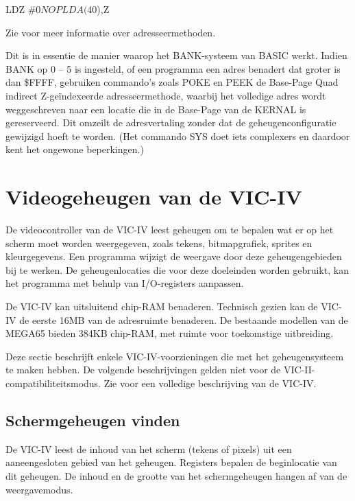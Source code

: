 \begin{asmcode}
LDZ #$0
NOP
LDA ($40),Z
\end{asmcode}

Zie  voor meer informatie over adresseermethoden.

Dit is in essentie de manier waarop het BANK-systeem van BASIC werkt. Indien BANK op 0 -- 5 is ingesteld, of een programma een adres benadert dat groter is dan \$FFFF, gebruiken commando's zoals POKE en PEEK de Base-Page Quad indirect Z-geïndexeerde adresseermethode, waarbij het volledige adres wordt weggeschreven naar een locatie die in de Base-Page van de KERNAL is gereserveerd. Dit omzeilt de adresvertaling zonder dat de geheugenconfiguratie gewijzigd hoeft te worden. (Het commando SYS doet iets complexers en daardoor kent het ongewone beperkingen.)


\newpage
\section{Videogeheugen van de VIC-IV}

De videocontroller van de VIC-IV leest geheugen om te bepalen wat er op het scherm moet worden weergegeven, zoals tekens, bitmapgrafiek, sprites en kleurgegevens. Een programma wijzigt de weergave door deze geheugengebieden bij te werken. De geheugenlocaties die voor deze doeleinden worden gebruikt, kan het programma met behulp van I/O-registers aanpassen.

De VIC-IV kan uitsluitend chip-RAM benaderen. Technisch gezien kan de VIC-IV de eerste 16MB van de adresruimte benaderen. De bestaande modellen van de MEGA65 bieden 384KB chip-RAM, met ruimte voor toekomstige uitbreiding.

Deze sectie beschrijft enkele VIC-IV-voorzieningen die met het geheugensysteem te maken hebben. De volgende beschrijvingen gelden niet voor de VIC-II-compatibiliteitsmodus. Zie  voor een volledige beschrijving van de VIC-IV.

\subsection{Schermgeheugen vinden}

De VIC-IV leest de inhoud van het scherm (tekens of pixels) uit een aaneengesloten gebied van het geheugen. Registers bepalen de beginlocatie van dit geheugen. De inhoud en de grootte van het schermgeheugen hangen af van de weergavemodus.


